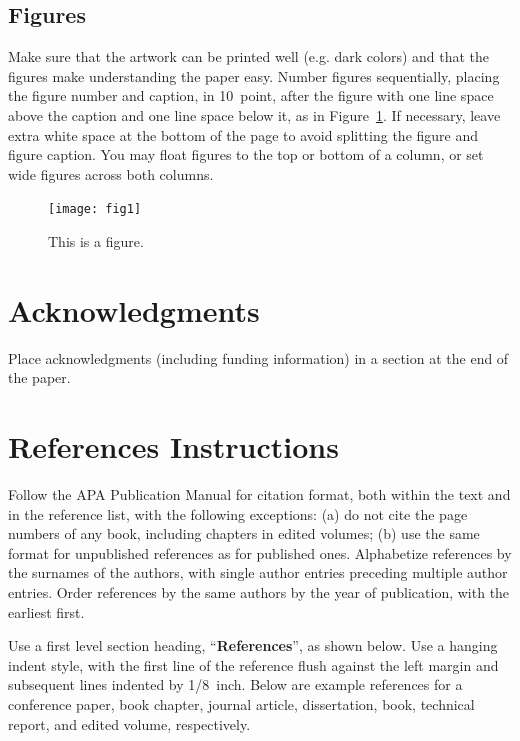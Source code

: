 \documentclass[10pt,letterpaper]{article}
\begin{document}
\subsection{Figures}

Make sure that the artwork can be printed well (e.g. dark colors) and that 
the figures make understanding the paper easy.
 Number figures sequentially, placing the figure
number and caption, in 10~point, after the figure with one line space
above the caption and one line space below it, as in
Figure~\ref{sample-figure}. If necessary, leave extra white space at
the bottom of the page to avoid splitting the figure and figure
caption. You may float figures to the top or bottom of a column, or
set wide figures across both columns.

\begin{figure}[ht]
\begin{center}
\texttt{[image: fig1]}
\end{center}
\caption{This is a figure.} 
\label{sample-figure}
\end{figure}


\section{Acknowledgments}

Place acknowledgments (including funding information) in a section at
the end of the paper.


\section{References Instructions}

Follow the APA Publication Manual for citation format, both within the
text and in the reference list, with the following exceptions: (a) do
not cite the page numbers of any book, including chapters in edited
volumes; (b) use the same format for unpublished references as for
published ones. Alphabetize references by the surnames of the authors,
with single author entries preceding multiple author entries. Order
references by the same authors by the year of publication, with the
earliest first.

Use a first level section heading, ``{\bf References}'', as shown
below. Use a hanging indent style, with the first line of the
reference flush against the left margin and subsequent lines indented
by 1/8~inch. Below are example references for a conference paper, book
chapter, journal article, dissertation, book, technical report, and
edited volume, respectively.

\nocite{ChalnickBillman1988a}
\nocite{Feigenbaum1963a}
\nocite{Hill1983a}
\nocite{OhlssonLangley1985a}
\nocite{Matlock2001}
\nocite{NewellSimon1972a}
\nocite{ShragerLangley1990a}




\setlength{\bibleftmargin}{.125in}
\setlength{\bibindent}{-\bibleftmargin}


\end{document}
